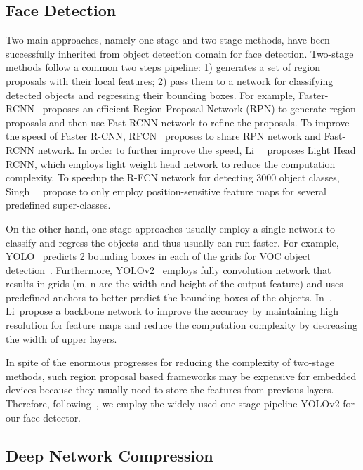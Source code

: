\documentclass[10pt,twocolumn,letterpaper]{article}
\begin{document}
\subsection{Face Detection}
Two main approaches, namely one-stage and two-stage methods,  have been successfully inherited from object detection domain for face detection. Two-stage methods follow a common two steps pipeline: 1) generates a set of region proposals with their local features; 2) pass them to a network for classifying detected objects and regressing their bounding boxes. For example, Faster-RCNN~\cite{FasterRCNN} proposes an efficient Region Proposal Network (RPN) to generate region proposals and then use Fast-RCNN network to refine the proposals. To improve the speed of Faster R-CNN,  RFCN~\cite{RFCN} proposes to share RPN network and Fast-RCNN network. In order to further improve the speed, Li~\etal~\cite{LightHeadRCNN} proposes Light Head RCNN, which employs light weight head network to reduce the computation complexity. To speedup the R-FCN network for detecting 3000 object classes, Singh~\etal ~\cite{RFCN-3000} propose to only employ position-sensitive feature maps for several predefined super-classes.

On the other hand, one-stage approaches usually employ a single network to classify and regress the objects~\cite{SSD,YOLO,YOLOv2}and thus usually can run faster. For example, YOLO~\cite{YOLO} predicts 2 bounding boxes in each of the  grids for VOC object detection~\cite{VOC}. Furthermore, YOLOv2~\cite{YOLOv2} employs fully convolution network that results in  grids (m, n are the width and height of the output feature) and uses predefined anchors to better predict the bounding boxes of the objects. In~\cite{DetNet}, Li~\etal propose a backbone network to improve the accuracy by maintaining high resolution for feature maps and reduce the computation complexity by decreasing the width of upper layers.


In spite of the enormous progresses for reducing the complexity of two-stage methods, such region proposal based frameworks may be expensive for embedded devices because they usually need to store the features from previous layers. Therefore, following~\cite{IFQNet}, we employ  the widely used one-stage pipeline YOLOv2 for our face detector.






\subsection{Deep Network Compression}
\end{document}
